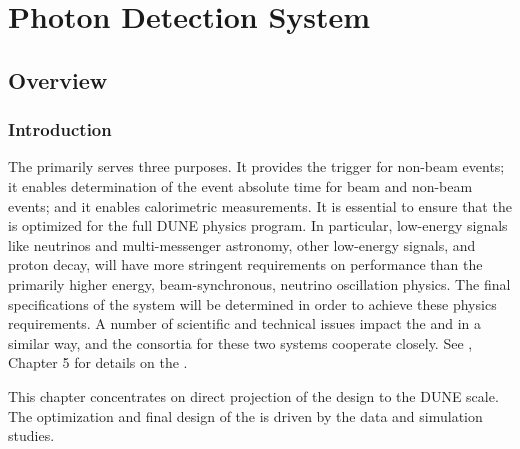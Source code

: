 \chapter{Photon Detection System}
\label{ch:fddp-pd}

\section{Overview}
\label{sec:fddp-pd-1}

\subsection{Introduction}
\label{sec:fddp-pd-1.1}

The   primarily serves three purposes. It provides the trigger for non-beam events; it enables determination of the event absolute time for beam and non-beam events; and it enables calorimetric measurements. 
It is essential to ensure that the \dual {} is optimized for the full DUNE physics program. In particular, low-energy signals like  neutrinos and multi-messenger astronomy, other low-energy signals, and proton decay, will have more stringent requirements on  performance than the primarily higher energy, beam-synchronous, neutrino oscillation physics. The final specifications of the system will be determined in order to achieve these physics requirements. 
A number of scientific and technical issues impact the \dual {}  and \single {}  in a similar way, and the consortia for these two systems cooperate closely.  See \voltitlespfd{}, Chapter 5 for details on the \single {}.

This %
 chapter concentrates on direct projection of the  design to the DUNE scale. The optimization and final design of the \dual {} is driven by the  \cite{protoDUNDP-tdr} data and simulation studies.


